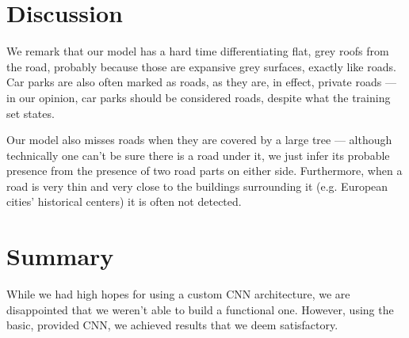 \documentclass[11pt,conference,compsocconf]{IEEEtran}
\begin{document}
\section{Discussion}
We remark that our model has a hard time differentiating flat, grey roofs from the road, probably because those are expansive grey surfaces, exactly like roads. Car parks are also often marked as roads, as they are, in effect, private roads --- in our opinion, car parks should be considered roads, despite what the training set states.

Our model also misses roads when they are covered by a large tree --- although technically one can't be sure there is a road under it, we just infer its probable presence from the presence of two road parts on either side. Furthermore, when a road is very thin and very close to the buildings surrounding it (e.g. European cities' historical centers) it is often not detected.

\section{Summary}
While we had high hopes for using a custom CNN architecture, we are disappointed that we weren't able to build a functional one. However, using the basic, provided CNN, we achieved results that we deem satisfactory.
\end{document}
